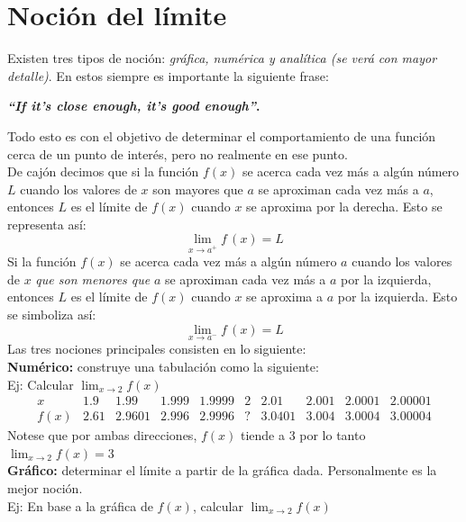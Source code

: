 \documentclass[letterpaper, 12pt]{article}
\begin{document}
    \section{Noción del límite}
    \justify
    Existen tres tipos de noción: \emph{gráfica, numérica y analítica (se verá con mayor detalle)}. En estos siempre es importante la siguiente frase:
    \begin{center}
    \textbf{\emph{``If it's close enough, it's good enough''}.}  
    \end{center}
    \justify
    Todo esto es con el objetivo de determinar el comportamiento de una función cerca de un punto de interés, pero no realmente en ese punto.
    \\\newline
    De cajón decimos que si la función \(f(x)\) se acerca cada vez más a algún número \(L\) cuando los valores de \(x\) son mayores que \(a\) se aproximan cada vez más a \(a\), entonces \(L\) es el límite de 
    \(f(x)\) cuando \(x\) se aproxima por la derecha. Esto se representa así:
    \[\lim_{x\rightarrow a^+}f\,(x)=L\]
    Si la función \(f(x)\) se acerca cada vez más a algún número \(a\) cuando los valores de \(x\) \emph{que son menores que} \(a\) se aproximan cada vez más a \(a\) por la izquierda, entonces \(L\) es el límite
    de \(f(x)\) cuando \(x\) se aproxima a \(a\) por la izquierda. Esto se simboliza así:
    \[\lim_{x\rightarrow a^-}f\,(x)=L\]
    Las tres nociones principales consisten en lo siguiente:
    \\\newline
    \textbf{Numérico: }construye una tabulación como la siguiente:
    \\Ej: Calcular \(\lim_{x\rightarrow 2}f(x)\)
    \[\begin{matrix}
        x&1.9&1.99&1.999&1.9999&2&2.01&2.001&2.0001&2.00001\\
    f(x)&2.61&2.9601&2.996&2.9996&?&3.0401&3.004&3.0004&3.00004
    \end{matrix}\]
    Notese que por ambas direcciones, \(f(x)\) tiende a 3 por lo tanto \(\lim_{x\rightarrow 2}f(x)=3\)
    \\\newline
    \textbf{Gráfico: }determinar el límite a partir de la gráfica dada. Personalmente es la mejor noción.
    \\Ej: En base a la gráfica de \(f(x)\), calcular \(\lim_{x\rightarrow 2}f(x)\)
\end{document}
